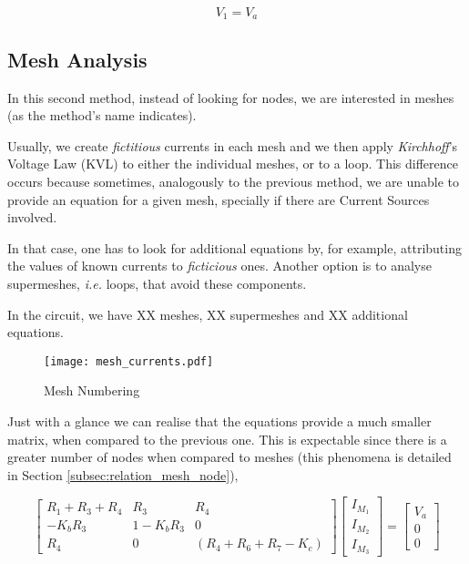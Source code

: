 \begin{equation}
    V_1 = V_a     
\end{equation}

\subsection{Mesh Analysis}
\label{subsec:mesh_analysis}

In this second method, instead of looking for nodes, we are interested in meshes (as the method's name indicates).

Usually, we create \textit{fictitious} currents in each mesh and we then apply \textit{Kirchhoff}'s Voltage Law (KVL) to either the individual meshes, or to a loop. 
This difference occurs because sometimes, analogously to the previous method, we are unable to provide an equation for a given mesh, specially if there are Current Sources involved. 

In that case, one has to look for additional equations by, for example, attributing the values of known currents to \textit{ficticious} ones. Another option is to analyse supermeshes, \textit{i.e.} loops, that avoid these components.

In the circuit, we have XX meshes, XX supermeshes and XX additional equations. 

\begin{figure}[h] \centering
\texttt{[image: mesh\_currents.pdf]}
\caption{Mesh Numbering}
\label{fig:mesh_numbering}
\end{figure}

Just with a glance we can realise that the equations provide a much smaller matrix, when compared to the previous one. This is expectable since there is a greater number of nodes when compared to meshes (this phenomena is detailed in Section \ref{subsec:relation_mesh_node}),

\begin{equation}
\label{eq_mesh}
\begin{bmatrix}
R_1+R_3+R_4 & R_3 & R_4 \\
-K_bR_3 & 1-K_bR_3 & 0 \\
R_4 & 0 & (R_4+R_6+R_7-K_c)
\end{bmatrix}
\begin{bmatrix}
I_{M_1}\\
I_{M_2} \\
I_{M_3}
\end{bmatrix}
=
\begin{bmatrix}
V_a \\
0 \\
0
\end{bmatrix}
\end{equation}


